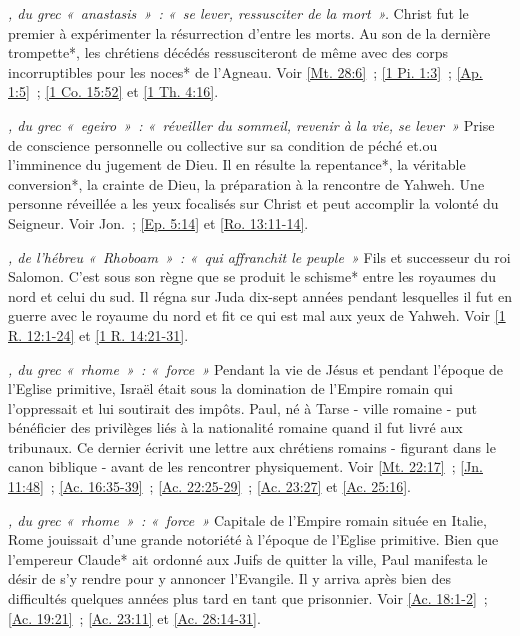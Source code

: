 \begin{multicols}{2}
\textit{, du grec «~anastasis~»~: «~se lever, ressusciter de la mort~».}\newline
Christ fut le premier à expérimenter la résurrection d'entre les morts. Au son de la dernière trompette*, les chrétiens décédés ressusciteront de même avec des corps incorruptibles pour les noces* de l'Agneau. Voir \vref{Mt. 28:6}~; \vref{1 Pi. 1:3}~; \vref{Ap. 1:5}~; \vref{1 Co. 15:52} et \vref{1 Th. 4:16}.

\textit{, du grec «~egeiro~»~: «~réveiller du sommeil, revenir à la vie, se lever~»}\newline
Prise de conscience personnelle ou collective sur sa condition de péché et.ou l'imminence du jugement de Dieu. Il en résulte la repentance*, la véritable conversion*, la crainte de Dieu, la préparation à la rencontre de Yahweh. Une personne réveillée a les yeux focalisés sur Christ et peut accomplir la volonté du Seigneur. Voir Jon.~; \vref{Ep. 5:14} et \vref{Ro. 13:11-14}.

\textit{, de l'hébreu «~Rhoboam~»~: «~qui affranchit le peuple~»}\newline
Fils et successeur du roi Salomon. C'est sous son règne que se produit le schisme* entre les royaumes du nord et celui du sud. Il régna sur Juda dix-sept années pendant lesquelles il fut en guerre avec le royaume du nord et fit ce qui est mal aux yeux de Yahweh.\newline
Voir \vref{1 R. 12:1-24} et \vref{1 R. 14:21-31}.

\textit{, du grec «~rhome~»~: «~force~»}\newline
Pendant la vie de Jésus et pendant l'époque de l'Eglise primitive, Israël était sous la domination de l'Empire romain qui l'oppressait et lui soutirait des impôts. Paul, né à Tarse - ville romaine - put bénéficier des privilèges liés à la nationalité romaine quand il fut livré aux tribunaux. Ce dernier écrivit une lettre aux chrétiens romains - figurant dans le canon biblique - avant de les rencontrer physiquement. Voir \vref{Mt. 22:17}~; \vref{Jn. 11:48}~; \vref{Ac. 16:35-39}~; \vref{Ac. 22:25-29}~; \vref{Ac. 23:27} et \vref{Ac. 25:16}.

\textit{, du grec «~rhome~»~: «~force~»}\newline
Capitale de l'Empire romain située en Italie, Rome jouissait d'une grande notoriété à l'époque de l'Eglise primitive. Bien que l'empereur Claude* ait ordonné aux Juifs de quitter la ville, Paul manifesta le désir de s'y rendre pour y annoncer l'Evangile. Il y arriva après bien des difficultés quelques années plus tard en tant que prisonnier. Voir \vref{Ac. 18:1-2}~; \vref{Ac. 19:21}~; \vref{Ac. 23:11} et \vref{Ac. 28:14-31}.


\end{multicols}
